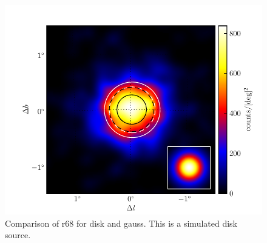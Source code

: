 \documentclass[12pt,preprint]{aastex}
\begin{document}
  \begin{figure}
    \begin{center}
      \includegraphics{mc_plots/compare_r68.pdf}
    \end{center}
    \caption{Comparison of r68 for disk and gauss. This is a simulated disk source.
    }\label{compare_r68}
  \end{figure}
\end{document}
